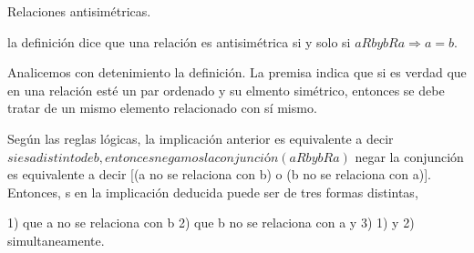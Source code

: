 Relaciones antisimétricas.

la definición dice que una relación es antisimétrica si y solo si $aRb y bRa \Rightarrow a=b$.

Analicemos con detenimiento la definición.
La premisa indica que si es verdad que en una relación esté un par ordenado y su elmento simétrico, entonces se debe tratar de un mismo elemento relacionado con sí mismo. 

Según las reglas lógicas, la implicación anterior es equivalente a decir
$si es a distinto de b, entonces negamos la conjunción (aRb y bRa)$
negar la conjunción es equivalente a decir [(a no se relaciona con b) o (b no se relaciona con a)]. Entonces, s en la implicación deducida puede ser de tres formas distintas, 

1) que a no se relaciona con b
2) que b no se relaciona con a
y
3) 1) y 2) simultaneamente.




